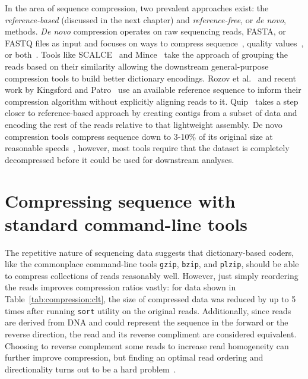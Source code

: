 \documentclass[12pt]{cmuthesis}
\makeatletter
\newcommand{\etal}{et al.\@\xspace}
\makeatother
\begin{document}
In the area of sequence compression, two prevalent approaches exist: the \textit{reference-based} (discussed in the next chapter) and \textit{reference-free}, or \textit{de novo}, methods. \textit{De novo} compression operates on raw sequencing reads, FASTA, or FASTQ files as input and focuses on ways to compress sequence~\cite{Mince,PathEncode,Rozov2014}, quality values~\cite{SeqSqueeze,KmerQuals,JaninQuals}, or both~\cite{GSQZ,Sahinalp2012}. Tools like SCALCE~\cite{Sahinalp2012} and Mince~\cite{Mince} take the approach of grouping the reads based on their similarity allowing the downstream general-purpose compression tools to build better dictionary encodings. Rozov \etal~\cite{Rozov2014} and recent work by Kingsford and Patro~\cite{PathEncode} use an available reference sequence to inform their compression algorithm without explicitly aligning reads to it. Quip~\cite{Jones2012} takes a step closer to reference-based approach by creating contigs from a subset of data and encoding the rest of the reads relative to that lightweight assembly. De novo compression tools compress sequence down to 3-10\% of its original size at reasonable speeds~\cite{Deorowicz2013}, however, most tools require that the dataset is completely decompressed before it could be used for downstream analyses.


\section{Compressing sequence with standard command-line tools}

  The repetitive nature of sequencing data suggests that dictionary-based coders, like the commonplace command-line tools \texttt{gzip}, \texttt{bzip}, and \texttt{plzip}, should be able to compress collections of reads reasonably well. However, just simply reordering the reads improves compression ratios vastly: for data shown in Table~\ref{tab:compression:clt}, the size of compressed data was reduced by up to 5 times after running \texttt{sort} utility on the original reads. Additionally, since reads are derived from DNA and could represent the sequence in the forward or the reverse direction, the read and its reverse compliment are considered equivalent. Choosing to reverse complement some reads to increase read homogeneity can further improve compression, but finding an optimal read ordering and directionality turns out to be a hard problem~\cite{PatroLCPRC}.
\end{document}
